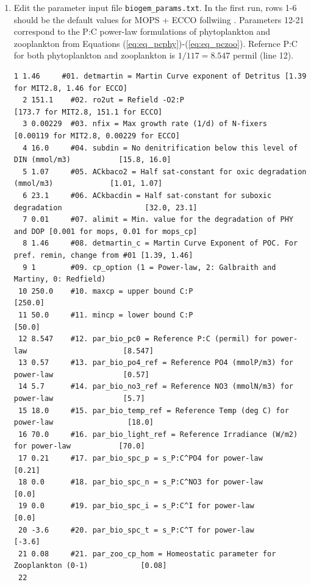 \documentclass[a4paper]{article}
\begin{document}
\begin{enumerate}
\item Edit the parameter input file \verb|biogem_params.txt|. In the first run, rows 1-6 should be the default values for MOPS + ECCO follwiing \cite{Kriest20}. Parameters 12-21 correspond to the P:C power-law formulations of phytoplankton and zooplankton from Equations (\ref{eq:eq_pcphy})-(\ref{eq:eq_pczoo}). Refernce P:C for both phytoplankton and zooplankton is $1/117 = 8.547$ permil (line 12). \begin{lstlisting}[frame=single,basicstyle=\scriptsize,commentstyle=\color{blue}]
  1 1.46     #01. detmartin = Martin Curve exponent of Detritus [1.39 for MIT2.8, 1.46 for ECCO]
  2 151.1    #02. ro2ut = Refield -O2:P                         [173.7 for MIT2.8, 151.1 for ECCO]
  3 0.00229  #03. nfix = Max growth rate (1/d) of N-fixers      [0.00119 for MIT2.8, 0.00229 for ECCO]
  4 16.0     #04. subdin = No denitrification below this level of DIN (mmol/m3)           [15.8, 16.0]
  5 1.07     #05. ACkbaco2 = Half sat-constant for oxic degradation (mmol/m3)             [1.01, 1.07]
  6 23.1     #06. ACkbacdin = Half sat-constant for suboxic degradation                   [32.0, 23.1]
  7 0.01     #07. alimit = Min. value for the degradation of PHY and DOP [0.001 for mops, 0.01 for mops_cp]
  8 1.46     #08. detmartin_c = Martin Curve Exponent of POC. For pref. remin, change from #01 [1.39, 1.46]
  9 1        #09. cp_option (1 = Power-law, 2: Galbraith and Martiny, 0: Redfield)
 10 250.0    #10. maxcp = upper bound C:P                                                 [250.0]
 11 50.0     #11. mincp = lower bound C:P                                                 [50.0]
 12 8.547    #12. par_bio_pc0 = Reference P:C (permil) for power-law                      [8.547]
 13 0.57     #13. par_bio_po4_ref = Reference PO4 (mmolP/m3) for power-law                [0.57]
 14 5.7      #14. par_bio_no3_ref = Reference NO3 (mmolN/m3) for power-law                [5.7]
 15 18.0     #15. par_bio_temp_ref = Reference Temp (deg C) for power-law                 [18.0]
 16 70.0     #16. par_bio_light_ref = Reference Irradiance (W/m2) for power-law           [70.0]
 17 0.21     #17. par_bio_spc_p = s_P:C^PO4 for power-law                                 [0.21]
 18 0.0      #18. par_bio_spc_n = s_P:C^NO3 for power-law                                 [0.0]
 19 0.0      #19. par_bio_spc_i = s_P:C^I for power-law                                   [0.0]
 20 -3.6     #20. par_bio_spc_t = s_P:C^T for power-law                                   [-3.6]
 21 0.08     #21. par_zoo_cp_hom = Homeostatic parameter for Zooplankton (0-1)            [0.08]
 22
\end{lstlisting}


\end{enumerate}
\end{document}
